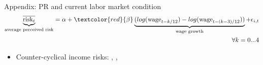 \documentclass{beamer}
\begin{document}
\begin{frame}{Appendix: PR and current labor market condition}
		\label{appendix:PR_macro_labor_market_correlation}
	\begin{eqnarray*}
		\underbrace{\overline{\text{risk}_{t}}}_{\text{average perceived risk}} = \alpha + \textcolor{red}{\beta} \underbrace{(log(\text{wage}_{t-k/12}) - log(\text{wage}_{t-(k-3)/12}))}  _{\text{wage growth}}  + \epsilon_{i,t}	 \\
		\quad \forall k =0...4
	\end{eqnarray*}
	
	\begin{table}
		\centering
		\label{macro_corr_he}
	\end{table}
	\begin{itemize}
		\item Counter-cyclical income risks: \cite{storesletten2004cyclical}, \cite{guvenen2014nature}, \cite{bayer2019precautionary}
	\end{itemize}
	\quad  \hyperlink{otherresults}{} 
\end{frame}
\end{document}
